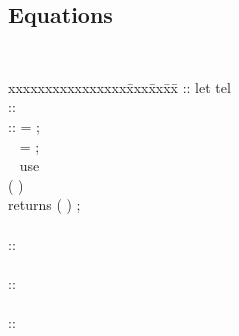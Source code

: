 \subsection{Equations}
{\tt
\begin{tabbing}
xxxxxxxxxxxxxxxx\= xxx\= xx\=  xx\= \kill
\EquationBlock \>::\>\> let \EquationList tel \\
\EquationList  \>::\>\> \Opt{ \EquationList } \Equation\\
\Equation\>::\>\> \Identifier [ \IndexList ] = \Expression ;\\
\>\> \Alt\ \> \Identifier = \Expression ;\\
\>\> \Alt\ \> use \Opt{ \ExtensionDomain} \Identifier
                                     \\
\>\>\>\>( \InputList )\\
\>\>\>\> returns ( \IdentifierList ) ;\\
\\
\ParamAssignation \>::\>\> \AffineFunction \\
\\
\InputList \>::\>\> \Opt{ \InputList , } \Expression\\
\\
\ExtensionDomain \>::\>\> \Domain \\
\end{tabbing}
}

